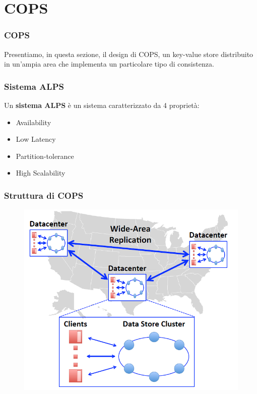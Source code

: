 \section{COPS}
\begin{frame}
\frametitle{COPS}
Presentiamo, in questa sezione, il design di COPS, un key-value store
distribuito in un'ampia area che implementa un particolare tipo di consistenza.
\end{frame}

\begin{frame}
\frametitle{Sistema ALPS}
	\begin{definizione}
	Un \textbf{sistema ALPS} è un sistema caratterizzato da 4 proprietà:
	\begin{itemize}
		\item<1-> Availability
		\item<1-> Low Latency
		\item<1-> Partition-tolerance
		\item<1-> High Scalability
	\end{itemize}
	\end{definizione}
\end{frame}

\begin{frame}
\frametitle{Struttura di COPS}
	\begin{figure}
		\centering
		\includegraphics[scale=0.45]{COPS/COPS1.png}
	\end{figure}
\end{frame}

